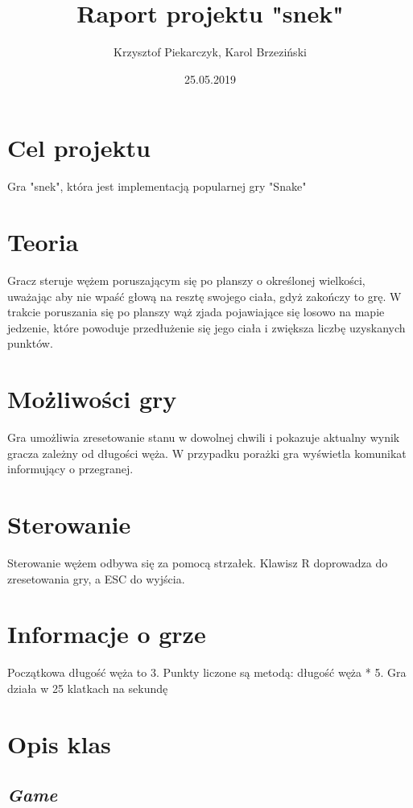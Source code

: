 \documentclass[12pt]{article}
\title{Raport projektu "snek"}
\author{Krzysztof Piekarczyk, Karol Brzeziński}
\date{25.05.2019}
\begin{document}
\maketitle


\section{Cel projektu}

Gra "snek", która jest implementacją popularnej gry "Snake"

\section{Teoria}

Gracz steruje wężem poruszającym się po planszy o określonej wielkości, uważając aby nie wpaść głową na resztę swojego ciała, gdyż zakończy to grę. W trakcie poruszania się po planszy wąż zjada pojawiające się losowo na mapie jedzenie, które powoduje przedłużenie się jego ciała i zwiększa liczbę uzyskanych punktów.

\section{Możliwości gry}

Gra umożliwia zresetowanie stanu w dowolnej chwili i pokazuje aktualny wynik gracza zależny od długości węża. W przypadku porażki gra wyświetla komunikat informujący o przegranej.

\section{Sterowanie}

Sterowanie wężem odbywa się za pomocą strzałek. Klawisz R doprowadza do zresetowania gry, a ESC do wyjścia.

\section{Informacje o grze}

Początkowa długość węża to 3. Punkty liczone są metodą: długość węża * 5. Gra działa w 25 klatkach na sekundę

\section{Opis klas}

\subsection{\textbf{\textit{Game}}}
\end{document}
